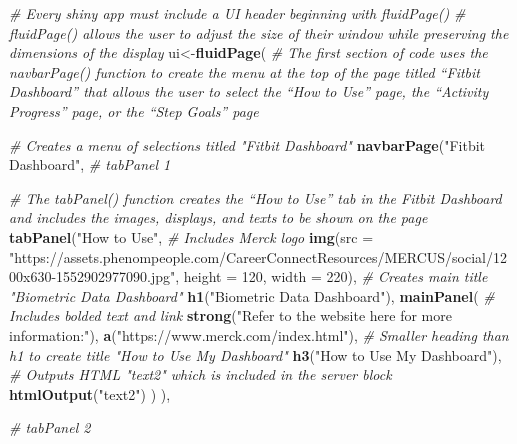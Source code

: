 \documentclass[]{book}
\newenvironment{Shaded}{\begin{snugshade}}{\end{snugshade}}
\newcommand{\KeywordTok}[1]{\textcolor[rgb]{0.13,0.29,0.53}{\textbf{#1}}}
\newcommand{\DataTypeTok}[1]{\textcolor[rgb]{0.13,0.29,0.53}{#1}}
\newcommand{\DecValTok}[1]{\textcolor[rgb]{0.00,0.00,0.81}{#1}}
\newcommand{\StringTok}[1]{\textcolor[rgb]{0.31,0.60,0.02}{#1}}
\newcommand{\CommentTok}[1]{\textcolor[rgb]{0.56,0.35,0.01}{\textit{#1}}}
\newcommand{\NormalTok}[1]{#1}
\begin{document}
\begin{Shaded}
\begin{Highlighting}[]
{{\CommentTok{# Every shiny app must include a UI header beginning with fluidPage()}
\CommentTok{# fluidPage() allows the user to adjust the size of their window while preserving the dimensions of the display}
\NormalTok{ui<-}\KeywordTok{fluidPage}\NormalTok{(}
  \CommentTok{# The first section of code uses the navbarPage() function to create the menu at the top of the page titled “Fitbit Dashboard” that allows the user to select the “How to Use” page, the “Activity Progress” page, or the “Step Goals” page}
  
  \CommentTok{# Creates a menu of selections titled "Fitbit Dashboard"}
  \KeywordTok{navbarPage}\NormalTok{(}\StringTok{"Fitbit Dashboard"}\NormalTok{,          }
             \CommentTok{# tabPanel 1}
             
             \CommentTok{# The tabPanel() function creates the “How to Use” tab in the Fitbit Dashboard and includes the images, displays, and texts to be shown on the page}
             \KeywordTok{tabPanel}\NormalTok{(}\StringTok{"How to Use"}\NormalTok{,}
                      \CommentTok{# Includes Merck logo}
                      \KeywordTok{img}\NormalTok{(}\DataTypeTok{src =} \StringTok{"https://assets.phenompeople.com/CareerConnectResources/MERCUS/social/1200x630-1552902977090.jpg"}\NormalTok{, }\DataTypeTok{height =} \DecValTok{120}\NormalTok{, }\DataTypeTok{width =} \DecValTok{220}\NormalTok{),}
                      \CommentTok{# Creates main title "Biometric Data Dashboard"}
                      \KeywordTok{h1}\NormalTok{(}\StringTok{"Biometric Data Dashboard"}\NormalTok{),}
                      \KeywordTok{mainPanel}\NormalTok{(}
                        \CommentTok{# Includes bolded text and link}
                        \KeywordTok{strong}\NormalTok{(}\StringTok{"Refer to the website here for more information:"}\NormalTok{),}
                        \KeywordTok{a}\NormalTok{(}\StringTok{"https://www.merck.com/index.html"}\NormalTok{),}
                        \CommentTok{# Smaller heading than h1 to create title "How to Use My Dashboard"}
                        \KeywordTok{h3}\NormalTok{(}\StringTok{"How to Use My Dashboard"}\NormalTok{),}
                        \CommentTok{# Outputs HTML "text2" which is included in the server block}
                        \KeywordTok{htmlOutput}\NormalTok{(}\StringTok{"text2"}\NormalTok{)}
\NormalTok{                      )                      }
\NormalTok{             ), }
             
             \CommentTok{# tabPanel 2}
             
}}
\end{Highlighting}
\end{Shaded}
\end{document}
